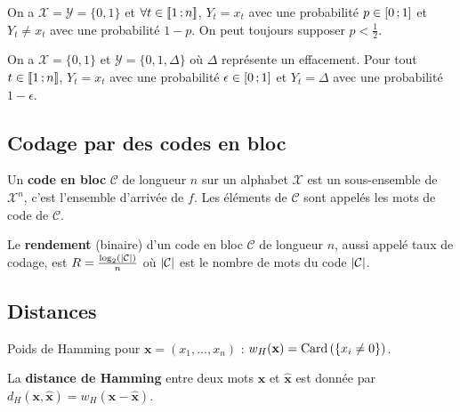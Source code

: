 	\begin{defn}
		On a $\mathcal{X} = \mathcal{Y} = \{ 0,1 \}$ et $\forall t \in \mathopen{}\mathclose{\left[\![1\mathclose{}\mathpunct{};n\right]\!]}$, $Y_t = x_t$ avec une probabilité $p \in \mathopen{[}0\mathclose{}\mathpunct{};1\mathclose{]}$ et $Y_t \neq x_t$ avec une probabilité $1 - p$.
		On peut toujours supposer $p < \frac{1}{2}$.
	\end{defn}

	\begin{defn}
		On a $\mathcal{X} = \{ 0,1 \}$ et $\mathcal{Y} = \{ 0,1,\Delta \}$ où $\Delta$ représente un effacement.
		Pour tout $t \in \mathopen{}\mathclose{\left[\![1\mathclose{}\mathpunct{};n\right]\!]}$, $Y_t = x_t$ avec une probabilité $\epsilon \in \mathopen{[}0\mathclose{}\mathpunct{};1\mathclose{]}$ et $Y_t = \Delta$ avec une probabilité $1 - \epsilon$.
	\end{defn}


\subsection{Codage par des codes en bloc}

	\begin{defn}
		Un \textbf{code en bloc} $\mathcal{C}$ de longueur $n$ sur un alphabet $\mathcal{X}$ est un sous-ensemble de $\mathcal{X}^n$, c'est l'ensemble d'arrivée de $f$.
		Les éléments de $\mathcal{C}$ sont appelés les mots de code de $\mathcal{C}$.
	\end{defn}

	\begin{defn}
		Le \textbf{rendement} (binaire) d'un code en bloc $\mathcal{C}$ de longueur $n$, aussi appelé taux de codage, est $R = \frac{\log_2(\left\lvert\mathcal{C}\right\rvert)}{n}$ où $\left\lvert\mathcal{C}\right\rvert$ est le nombre de mots du code $\left\lvert\mathcal{C}\right\rvert$.
	\end{defn}


\subsection{Distances}

	\begin{defn}
		Poids de Hamming pour $\mathbf{x} = (x_1,\ldots,x_n)$ : $w_H(\mathbf{x}) = \operatorname{Card} \left( \left\{ x_i \neq 0 \right\} \right)$.
	\end{defn}

	\begin{defn}
		La \textbf{distance de Hamming} entre deux mots $\mathbf{x}$ et $\mathbf{\hat{x}}$ est donnée par $d_H(\mathbf{x},\mathbf{\hat{x}}) = w_H(\mathbf{x} - \mathbf{\hat{x}})$.
	\end{defn}


